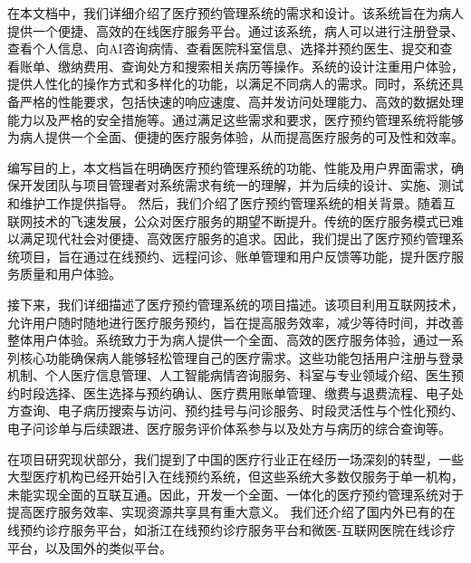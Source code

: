 在本文档中，我们详细介绍了医疗预约管理系统的需求和设计。该系统旨在为病人提供一个便捷、高效的在线医疗服务平台。通过该系统，病人可以进行注册登录、查看个人信息、向AI咨询病情、查看医院科室信息、选择并预约医生、提交和查看账单、缴纳费用、查询处方和搜索相关病历等操作。系统的设计注重用户体验，提供人性化的操作方式和多样化的功能，以满足不同病人的需求。同时，系统还具备严格的性能要求，包括快速的响应速度、高并发访问处理能力、高效的数据处理能力以及严格的安全措施等。通过满足这些需求和要求，医疗预约管理系统将能够为病人提供一个全面、便捷的医疗服务体验，从而提高医疗服务的可及性和效率。

编写目的上，本文档旨在明确医疗预约管理系统的功能、性能及用户界面需求，确保开发团队与项目管理者对系统需求有统一的理解，并为后续的设计、实施、测试和维护工作提供指导。
然后，我们介绍了医疗预约管理系统的相关背景。随着互联网技术的飞速发展，公众对医疗服务的期望不断提升。传统的医疗服务模式已难以满足现代社会对便捷、高效医疗服务的追求。因此，我们提出了医疗预约管理系统项目，旨在通过在线预约、远程问诊、账单管理和用户反馈等功能，提升医疗服务质量和用户体验。

接下来，我们详细描述了医疗预约管理系统的项目描述。该项目利用互联网技术，允许用户随时随地进行医疗服务预约，旨在提高服务效率，减少等待时间，并改善整体用户体验。系统致力于为病人提供一个全面、高效的医疗服务体验，通过一系列核心功能确保病人能够轻松管理自己的医疗需求。这些功能包括用户注册与登录机制、个人医疗信息管理、人工智能病情咨询服务、科室与专业领域介绍、医生预约时段选择、医生选择与预约确认、医疗费用账单管理、缴费与退费流程、电子处方查询、电子病历搜索与访问、预约挂号与问诊服务、时段灵活性与个性化预约、电子问诊单与后续跟进、医疗服务评价体系参与以及处方与病历的综合查询等。

在项目研究现状部分，我们提到了中国的医疗行业正在经历一场深刻的转型，一些大型医疗机构已经开始引入在线预约系统，但这些系统大多数仅服务于单一机构，未能实现全面的互联互通。因此，开发一个全面、一体化的医疗预约管理系统对于提高医疗服务效率、实现资源共享具有重大意义。
我们还介绍了国内外已有的在线预约诊疗服务平台，如浙江在线预约诊疗服务平台和微医-互联网医院在线诊疗平台，以及国外的类似平台。

